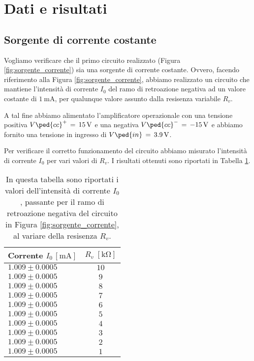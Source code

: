 \section*{Dati e risultati}

\subsection*{Sorgente di corrente costante}

Vogliamo verificare che il primo circuito realizzato (Figura \ref{fig:sorgente_corrente}) sia una sorgente di corrente costante. Ovvero, facendo riferimento alla Figura \ref{fig:sorgente_corrente}, abbiamo realizzato un circuito che mantiene l'intensità di corrente $I_0$ del ramo di retroazione negativa ad un valore costante di $\SI{1}{\milli\ampere}$, per qualunque valore assunto dalla resisenza variabile $R_v$.

A tal fine abbiamo alimentato l'amplificatore operazionale con una tensione positiva $V\ped{cc}^+\,=\,\SI{+15}{\volt}$ e una negativa $V\ped{cc}^-\,=\,\SI{-15}{\volt}$ e abbiamo fornito una tensione in ingresso di $V\ped{in}\,=\,\SI{+3.9}{\volt}$.

Per verificare il corretto funzionamento del circuito abbiamo misurato l'intensità di corrente $I_0$ per vari valori di $R_v$. I risultati ottenuti sono riportati in Tabella \ref{tab:corr_res}.


\begin{table}[H]
    \centering
    \small
    \begin{tabular}{l | c}
        \toprule
		Corrente $I_0 \, [\si{\milli\ampere}]$ & $R_v \; [\si{\kilo\ohm}]$ \\
        \midrule
		$ 1.009 \pm 0.0005 $ & $ 10 $ \\
		$ 1.009 \pm 0.0005 $ & $ 9 $ \\
		$ 1.009 \pm 0.0005 $ & $ 8 $ \\
		$ 1.009 \pm 0.0005 $ & $ 7 $ \\
		$ 1.009 \pm 0.0005 $ & $ 6 $ \\
		$ 1.009 \pm 0.0005 $ & $ 5 $ \\
		$ 1.009 \pm 0.0005 $ & $ 4 $ \\
		$ 1.009 \pm 0.0005 $ & $ 3 $ \\
		$ 1.009 \pm 0.0005 $ & $ 2 $ \\
		$ 1.009 \pm 0.0005 $ & $ 1 $ \\
        \bottomrule
    \end{tabular}
    \caption{In questa tabella sono riportati i valori dell'intensità di corrente $I_0$, passante per il ramo di retroazione negativa del circuito in Figura \ref{fig:sorgente_corrente}, al variare della resisenza $R_v$.}
    \label{tab:corr_res}
\end{table}

